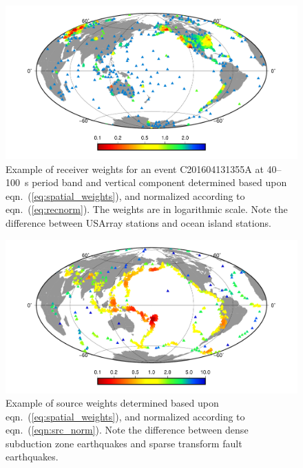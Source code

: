 \begin{figure}
 \centering 
   	\begin{minipage}[t]{.9\columnwidth}
  	\centering 
 	\includegraphics[width=.95\textwidth]{ch-weighting/figures/receiver-weights-40-100-Z.pdf}
	\end{minipage}
  \caption[Example of receiver weights]
  {\small{Example of receiver weights for an event C201604131355A at 40--100~s period band and vertical component determined based upon eqn.~(\ref{eq:spatial_weights}),
and normalized according to eqn.~(\ref{eq:recnorm}). The weights are in logarithmic scale.
Note the difference between USArray stations 
and ocean island stations. 
}}
\label{fig:receiver_weights}
\end{figure}

\begin{figure}
 \centering 
   	\begin{minipage}[t]{.9\columnwidth}
  	\centering 
	\includegraphics[width=.95\textwidth]{ch-weighting/figures/source-weights.pdf}
	\end{minipage}
  \caption[Example of source weights]
  {\small{Example of source weights determined based upon eqn.~(\ref{eq:spatial_weights}),
and normalized according to eqn.~(\ref{eqn:src_norm}).
Note the difference between dense subduction zone
earthquakes and sparse transform fault earthquakes.  
}}
\label{fig:source_weights}
\end{figure}

